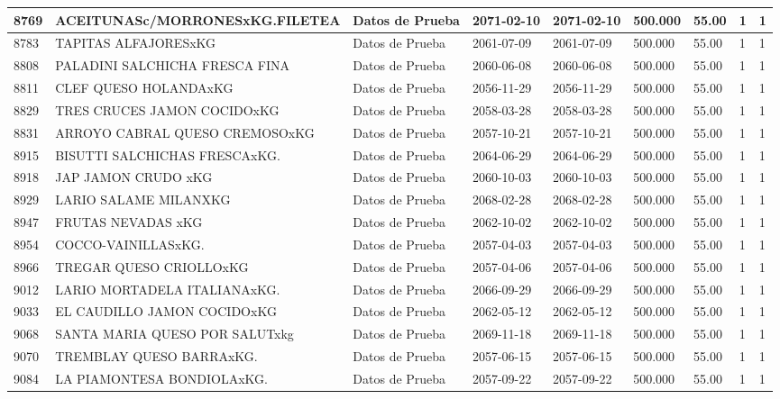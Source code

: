 \documentclass[a4paper,12pt]{article}
\begin{document}
\begin{landscape}
\begin{longtable}{|p{4cm}|p{2.5cm}|p{2.5cm}|p{1.8cm}|p{1.8cm}|p{1cm}|p{1cm}|p{3cm}|p{3cm}||}
8769 & ACEITUNASc/MORRONESxKG.FILETEA & Datos de Prueba & 2071-02-10 & 2071-02-10 & 500.000 & 55.00 & 1 & 1 \\ \hline 
8783 & TAPITAS ALFAJORESxKG & Datos de Prueba & 2061-07-09 & 2061-07-09 & 500.000 & 55.00 & 1 & 1 \\ \hline 
8808 & PALADINI SALCHICHA FRESCA FINA & Datos de Prueba & 2060-06-08 & 2060-06-08 & 500.000 & 55.00 & 1 & 1 \\ \hline 
8811 & CLEF QUESO HOLANDAxKG & Datos de Prueba & 2056-11-29 & 2056-11-29 & 500.000 & 55.00 & 1 & 1 \\ \hline 
8829 & TRES CRUCES JAMON COCIDOxKG & Datos de Prueba & 2058-03-28 & 2058-03-28 & 500.000 & 55.00 & 1 & 1 \\ \hline 
8831 & ARROYO CABRAL QUESO CREMOSOxKG & Datos de Prueba & 2057-10-21 & 2057-10-21 & 500.000 & 55.00 & 1 & 1 \\ \hline 
8915 & BISUTTI SALCHICHAS FRESCAxKG. & Datos de Prueba & 2064-06-29 & 2064-06-29 & 500.000 & 55.00 & 1 & 1 \\ \hline 
8918 & JAP JAMON CRUDO xKG & Datos de Prueba & 2060-10-03 & 2060-10-03 & 500.000 & 55.00 & 1 & 1 \\ \hline 
8929 & LARIO SALAME MILANXKG & Datos de Prueba & 2068-02-28 & 2068-02-28 & 500.000 & 55.00 & 1 & 1 \\ \hline 
8947 & FRUTAS NEVADAS xKG & Datos de Prueba & 2062-10-02 & 2062-10-02 & 500.000 & 55.00 & 1 & 1 \\ \hline 
8954 & COCCO-VAINILLASxKG. & Datos de Prueba & 2057-04-03 & 2057-04-03 & 500.000 & 55.00 & 1 & 1 \\ \hline 
8966 & TREGAR QUESO CRIOLLOxKG & Datos de Prueba & 2057-04-06 & 2057-04-06 & 500.000 & 55.00 & 1 & 1 \\ \hline 
9012 & LARIO MORTADELA ITALIANAxKG. & Datos de Prueba & 2066-09-29 & 2066-09-29 & 500.000 & 55.00 & 1 & 1 \\ \hline 
9033 & EL CAUDILLO JAMON COCIDOxKG & Datos de Prueba & 2062-05-12 & 2062-05-12 & 500.000 & 55.00 & 1 & 1 \\ \hline 
9068 & SANTA MARIA QUESO POR SALUTxkg & Datos de Prueba & 2069-11-18 & 2069-11-18 & 500.000 & 55.00 & 1 & 1 \\ \hline 
9070 & TREMBLAY QUESO BARRAxKG. & Datos de Prueba & 2057-06-15 & 2057-06-15 & 500.000 & 55.00 & 1 & 1 \\ \hline 
9084 & LA PIAMONTESA BONDIOLAxKG. & Datos de Prueba & 2057-09-22 & 2057-09-22 & 500.000 & 55.00 & 1 & 1 \\ \hline 

\end{longtable}
\end{landscape}
\end{document}
